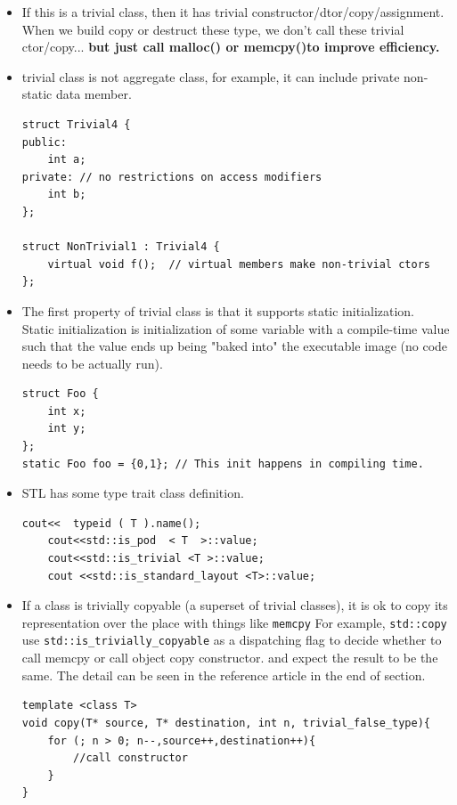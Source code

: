 \documentclass[a4paper,11pt,twoside]{book}
\begin{document}
\begin{itemize}
	\item If this is a trivial class, then it has trivial constructor/dtor/copy/assignment. When we build copy or destruct these type, we don't call these trivial ctor/copy... \textbf{but just call malloc() or memcpy()to improve efficiency.} 
	
	\item trivial class is not aggregate class, for example, it can include private non-static data member. 
\begin{lstlisting}[numbers=none]
struct Trivial4 {
public:
	int a;
private: // no restrictions on access modifiers
	int b;
};
		
struct NonTrivial1 : Trivial4 {
	virtual void f();  // virtual members make non-trivial ctors
};
\end{lstlisting}
		
	\item The first property of trivial class is that it supports static initialization. Static initialization is initialization of some variable with a compile-time value such that the value ends up being "baked into" the executable image (no code needs to be actually run).
\begin{lstlisting}[numbers=none]
struct Foo {
	int x;
	int y;
};
static Foo foo = {0,1}; // This init happens in compiling time.
\end{lstlisting}

\item STL has some type trait class definition. 
\begin{lstlisting}[numbers=none]
	cout<<  typeid ( T ).name();
	cout<<std::is_pod  < T  >::value;
	cout<<std::is_trivial <T >::value;
	cout <<std::is_standard_layout <T>::value;
\end{lstlisting}
	
	\item If a class is trivially copyable (a superset of trivial classes), it is ok to copy its representation over the place with things like \texttt{memcpy} For example, \texttt{std::copy} use \texttt{std::is\_trivially\_copyable} as a dispatching flag to decide whether to call memcpy or call object copy constructor. and expect the result to be the same. The detail can be seen in the reference article in the end of section. 
	
\begin{lstlisting}[numbers=none]
template <class T> 
void copy(T* source, T* destination, int n, trivial_false_type){
	for (; n > 0; n--,source++,destination++){
		//call constructor
	}
}
	

\end{lstlisting}
\end{itemize}
\end{document}
